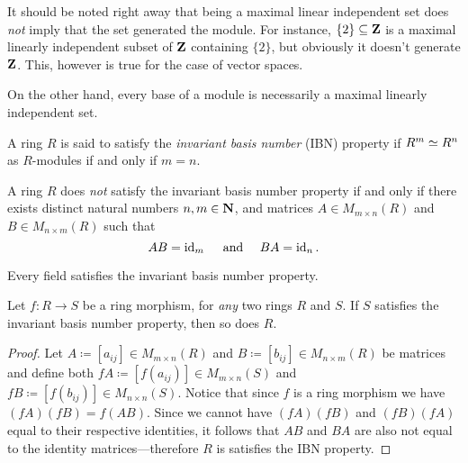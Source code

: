 \begin{remark}
\label{rem:maximality-not-generation}
It should be noted right away that being a maximal linear independent set does
\emph{not} imply that the set generated the module. For instance,
\(\{2\} \subseteq \mathbf{Z}\) is a maximal linearly independent subset of \(\mathbf{Z}\)
containing \(\{2\}\), but obviously it doesn't generate \(\mathbf{Z}\). This, however is
true for the case of vector spaces.

On the other hand, every base of a module is necessarily a maximal linearly
independent set.
\end{remark}

\begin{definition}
\label{def:IBN}
A ring \(R\) is said to satisfy the \emph{invariant basis number} (IBN) property
if \(R^m \simeq R^n\) as \(R\)-modules if and only if \(m = n\).
\end{definition}

\begin{corollary}
\label{cor:IBN-matrix-criterion}
A ring \(R\) does \emph{not} satisfy the invariant basis number property if and
only if there exists distinct natural numbers \(n, m \in \mathbf{N}\), and matrices \(A
\in M_{m \times n}(R)\) and \(B \in M_{n \times m}(R)\) such that
\[
A B = \operatorname{id}_m\quad \text{ and }\quad B A = \operatorname{id}_n.
\]
\end{corollary}

\begin{corollary}
\label{cor:fields-are-IBN}
Every field satisfies the invariant basis number property.
\end{corollary}

\begin{proposition}
\label{prop:IBN-morphism-criterion}
Let \(f: R \to S\) be a ring morphism, for \emph{any} two rings \(R\) and
\(S\). If \(S\) satisfies the invariant basis number property, then so does
\(R\).
\end{proposition}

\begin{proof}
Let \(A \coloneq [a_{ij}] \in M_{m \times n}(R)\) and
\(B \coloneq [b_{ij}] \in M_{n \times m}(R)\) be matrices and define both
\(fA \coloneq [f(a_{ij})] \in M_{m \times n}(S)\) and
\(fB \coloneq [f(b_{ij})] \in M_{n \times n}(S)\). Notice that since \(f\) is a
ring morphism we have \((f A)(f B) = f(A B)\). Since we cannot have \((f A) (f
B)\) and \((f B) (f A)\) equal to their respective identities, it follows that
\(A B\) and \(B A\) are also not equal to the identity matrices---therefore
\(R\) is satisfies the IBN property.
\end{proof}

